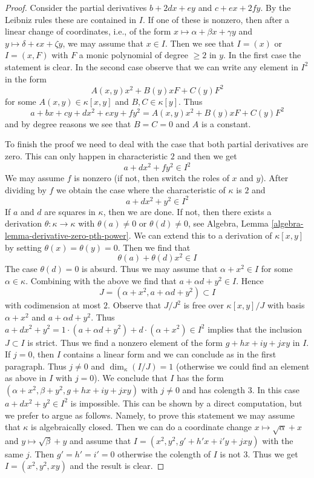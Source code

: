 \documentclass{stacks-project}
\theoremstyle{plain}
\theoremstyle{definition}
\theoremstyle{remark}
\numberwithin{equation}{subsection}
\begin{document}
\begin{proof}
Consider the partial derivatives $b + 2dx + ey$ and
$c + ex + 2fy$. By the Leibniz rules these are contained in $I$.
If one of these is nonzero, then after a linear change of coordinates,
i.e., of the form $x \mapsto \alpha + \beta x + \gamma y$ and
$y \mapsto \delta + \epsilon x + \zeta y$, we may assume
that $x \in I$. Then we see that $I = (x)$ or $I = (x, F)$ with
$F$ a monic polynomial of degree $\geq 2$ in $y$.
In the first case the statement is clear. In the second case
observe that we can write any element in $I^2$ in the form
$$
A(x, y) x^2 + B(y) x F + C(y) F^2
$$
for some $A(x, y) \in \kappa[x, y]$ and $B, C \in \kappa[y]$.
Thus
$$
a + b x + c y + d x^2 + exy + f y^2 = A(x, y) x^2 + B(y) x F + C(y) F^2
$$
and by degree reasons we see that $B = C = 0$ and $A$ is a constant.

\medskip\noindent
To finish the proof we need to deal with the case that both
partial derivatives are zero. This can only happen in characteristic $2$
and then we get
$$
a + d x^2 + f y^2 \in I^2
$$
We may assume $f$ is nonzero (if not, then switch the roles of $x$ and $y$).
After dividing by $f$ we obtain the case where the characteristic of
$\kappa$ is $2$ and
$$
a + d x^2 + y^2 \in I^2
$$
If $a$ and $d$ are squares in $\kappa$, then we are done. If not,
then there exists a derivation $\theta : \kappa \to \kappa$ with
$\theta(a) \not = 0$ or $\theta(d) \not = 0$, see
Algebra, Lemma \ref{algebra-lemma-derivative-zero-pth-power}.
We can extend this to a derivation of $\kappa[x, y]$ by setting
$\theta(x) = \theta(y) = 0$. Then we find that
$$
\theta(a) + \theta(d) x^2 \in I
$$
The case $\theta(d) = 0$ is absurd. Thus we may assume
that $\alpha + x^2 \in I$ for some $\alpha \in \kappa$.
Combining with the above we find that $a + \alpha d + y^2 \in I$.
Hence
$$
J = (\alpha + x^2, a + \alpha d + y^2) \subset I
$$
with codimension at most $2$. Observe that
$J/J^2$ is free over $\kappa[x, y]/J$ with basis
$\alpha + x^2$ and $a + \alpha d + y^2$.
Thus $a + d x^2 + y^2 =
1 \cdot (a + \alpha d + y^2) + d \cdot (\alpha + x^2) \in I^2$
implies that the inclusion $J \subset I$ is strict.
Thus we find a nonzero element of the form $g + hx + iy + jxy$ in $I$.
If $j = 0$, then $I$ contains a linear form and we can
conclude as in the first paragraph. Thus $j \not = 0$
and $\dim_\kappa(I/J) = 1$ (otherwise we could find
an element as above in $I$ with $j = 0$).
We conclude that $I$ has the form
$(\alpha + x^2, \beta + y^2, g + hx + iy + jxy)$
with $j \not = 0$ and has colength $3$.
In this case $a + dx^2 + y^2 \in I^2$ is impossible.
This can be shown by a direct computation, but we prefer to argue
as follows. Namely, to prove this statement we may assume that
$\kappa$ is algebraically closed. Then we can do a coordinate
change $x \mapsto \sqrt{\alpha} + x$ and $y \mapsto \sqrt{\beta} + y$
and assume that $I = (x^2, y^2, g' + h'x + i'y + jxy)$ with the same $j$.
Then $g' = h' = i' = 0$ otherwise the colength of $I$ is not $3$.
Thus we get $I = (x^2, y^2, xy)$ and the result is clear.
\end{proof}
\end{document}
